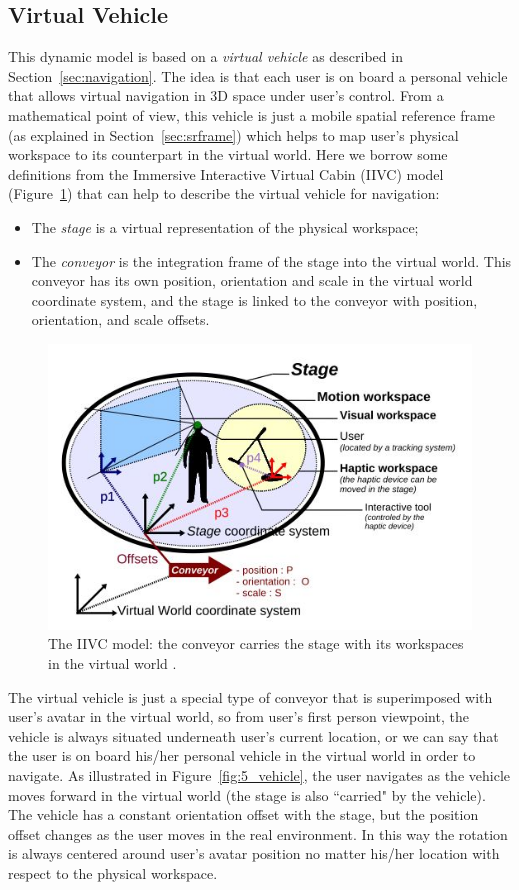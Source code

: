 \subsection{Virtual Vehicle}
This dynamic model is based on a \textit{virtual vehicle} as described in Section~\ref{sec:navigation}. The idea is that each user is on board a personal vehicle that allows virtual navigation in 3D space under user's control. From a mathematical point of view, this vehicle is just a mobile spatial reference frame (as explained in Section~\ref{sec:srframe}) which helps to map user's physical workspace to its counterpart in the virtual world. Here we borrow some definitions from the Immersive Interactive Virtual Cabin (IIVC) model (Figure~\ref{fig:5_iivc}) that can help to describe the virtual vehicle for navigation:

\begin{itemize}
\item The \textit{stage} is a virtual representation of the physical workspace;
\item The \textit{conveyor} is the integration frame of the stage into the virtual world. This conveyor has its own position, orientation and scale in the virtual world coordinate system, and the stage is linked to the conveyor with position, orientation, and scale offsets.
\end{itemize}

\begin{figure}[htb]
  \centering
  \includegraphics[width=.7\textwidth]{figures/ch5/IIVC}
  \caption{\label{fig:5_iivc}The IIVC model: the conveyor carries the stage with its workspaces in the virtual world \citep{Fleury2010Generic}.}
\end{figure}

The virtual vehicle is just a special type of conveyor that is superimposed with user's avatar in the virtual world, so from user's first person viewpoint, the vehicle is always situated underneath user's current location, or we can say that the user is on board his/her personal vehicle in the virtual world in order to navigate. As illustrated in Figure~\ref{fig:5_vehicle}, the user navigates as the vehicle moves forward in the virtual world (the stage is also ``carried" by the vehicle). The vehicle has a constant orientation offset with the stage, but the position offset changes as the user moves in the real environment. In this way the rotation is always centered around user's avatar position no matter his/her location with respect to the physical workspace.

